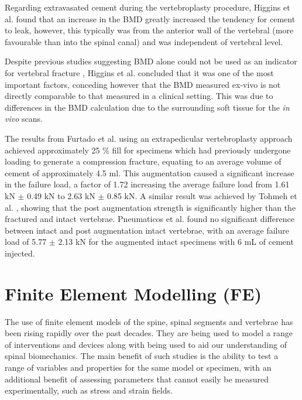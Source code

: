 Regarding extravasated cement during the vertebroplasty procedure,
Higgins et al. \cite{Higgins2007a} found that an increase in the BMD greatly
increased the tendency for cement to leak, however, this typically was from
the anterior wall of the vertebral (more favourable than into the spinal canal) and was independent of vertebral
level.

Despite previous studies suggesting BMD alone could not be used as an
indicator for vertebral fracture \cite{Aaron2000}, Higgins et al. concluded
that
it was one of the most important factors, conceding however that the BMD
measured ex-vivo is not directly comparable to that measured in a
clinical setting. This was due to differences in the BMD calculation due to the surrounding soft tissue for the \textit{in vivo} scans.

The results from Furtado et al. \cite{furtado2007biomechanical} using an
extrapedicular
vertebroplasty approach achieved approximately 25 \% fill for specimens
which had previously undergone loading to generate a compression
fracture, equating to an average volume of cement of approximately 4.5 ml.
This
augmentation caused a significant increase in the failure load, a factor
of 1.72 increasing the average failure load from 1.61 kN $\pm$ 0.49 kN to
2.63 kN $\pm$ 0.85 kN. A similar result was achieved by Tohmeh et al.
\cite{tohmeh1999biomechanical}, showing that the post augmentation strength is
significantly
higher than the fractured and intact vertebrae. Pneumaticos et al.
\cite{pneumaticos2013effect} found no significant difference between intact and
post
augmentation intact vertebrae, with an average failure load of 5.77 $\pm$
2.13 kN for the augmented intact specimens with 6 mL of cement
injected.

\section{Finite Element Modelling
(FE)}\label{finite-element-modelling-fe}

The use of finite element models of the spine, spinal segments and
vertebrae has been rising rapidly over the past decades. They are being
used to model a range of interventions and devices along with being used
to aid our understanding of spinal biomechanics. The main benefit of
such studies is the ability to test a range of variables and properties
for the same model or specimen, with an additional benefit of assessing
parameters that cannot easily be measured experimentally, such as stress and
strain fields.

